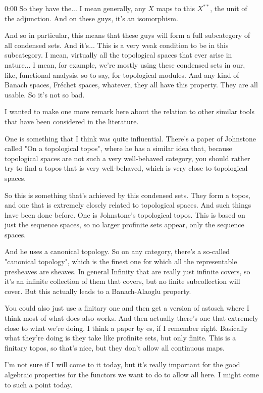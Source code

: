 \begin{unfinished}{0:00}
So they have the... I mean generally, any $X$ maps to this $X^{**}$, the unit of the adjunction. And on these guys, it's an isomorphism.

And so in particular, this means that these guys will form a full subcategory of all condensed sets. And it's... This is a very weak condition to be in this subcategory. I mean, virtually all the topological spaces that ever arise in nature... I mean, for example, we're mostly using these condensed sets in our, like, functional analysis, so to say, for topological modules. And any kind of Banach spaces, Fr\'echet spaces, whatever, they all have this property. They are all usable. So it's not so bad.

I wanted to make one more remark here about the relation to other similar tools that have been considered in the literature.

One is something that I think was quite influential. There's a paper of Johnstone called "On a topological topos", where he has a similar idea that, because topological spaces are not such a very well-behaved category, you should rather try to find a topos that is very well-behaved, which is very close to topological spaces.

So this is something that's achieved by this condensed sets. They form a topos, and one that is extremely closely related to topological spaces. And such things have been done before. One is Johnstone's topological topos. This is based on just the sequence spaces, so no larger profinite sets appear, only the sequence spaces.

And he uses a canonical topology. So on any category, there's a so-called "canonical topology", which is the finest one for which all the representable presheaves are sheaves. In general
Infinity that are really just infinite covers, so it's an infinite collection of them that covers, but no finite subcollection will cover. But this actually leads to a Banach-Alaoglu property.

You could also just use a finitary one and then get a version of astosch where I think most of what does also works. And then actually there's one that extremely close to what we're doing. I think a paper by es, if I remember right. Basically what they're doing is they take like profinite sets, but only finite. This is a finitary topos, so that's nice, but they don't allow all continuous maps.

I'm not sure if I will come to it today, but it's really important for the good algebraic properties for the functors we want to do to allow all here. I might come to such a point today.


\end{unfinished}
